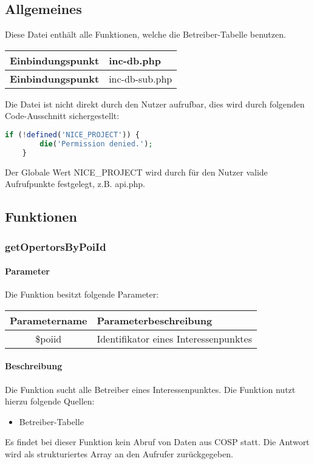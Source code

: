 \subsection{Allgemeines} Diese Datei enthält alle Funktionen, welche die Betreiber-Tabelle benutzen.
\begin{table}[H]
	\begin{tabular}{|c|p{11cm}|}
		\hline
		\textbf{Einbindungspunkt} & inc-db.php \\ \hline
		\textbf{Einbindungspunkt} & inc-db-sub.php \\ \hline
	\end{tabular}
\end{table}
Die Datei ist nicht direkt durch den Nutzer aufrufbar, dies wird durch folgenden Code-Ausschnitt sichergestellt:
\begin{lstlisting}[language=php]
	if (!defined('NICE_PROJECT')) {
		die('Permission denied.');
	}
\end{lstlisting}
Der Globale Wert {\glqq NICE\_PROJECT\grqq} wird durch für den Nutzer valide Aufrufpunkte festgelegt, z.B. {\glqq api.php\grqq}.
\newpage
\subsection{Funktionen}
\subsubsection{getOpertorsByPoiId}
\paragraph{Parameter} Die Funktion besitzt folgende Parameter:
\begin{table}[H]
	\begin{tabular}{|c|p{11cm}|}
		\hline
		\textbf{Parametername} & \textbf{Parameterbeschreibung} \\ \hline
		\$poiid & Identifikator eines Interessenpunktes \\ \hline
	\end{tabular}
\end{table}
\paragraph{Beschreibung} Die Funktion sucht alle Betreiber eines Interessenpunktes. Die Funktion nutzt hierzu folgende Quellen:
\begin{itemize}
	\item Betreiber-Tabelle
\end{itemize}
Es findet bei dieser Funktion kein Abruf von Daten aus {\glqq COSP\grqq} statt. Die Antwort wird als strukturiertes Array an den Aufrufer zurückgegeben.

